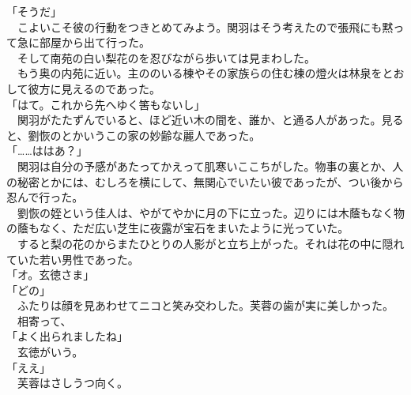 \documentclass[
  paper=a5,
  fontsize=10pt,
  jafontsize=9.5pt,
  tate,                  %
  open_bracket_pos=nibu, %
]{jlreq}
\begin{document}
「そうだ」\\


　こよいこそ彼の行動をつきとめてみよう。関羽はそう考えたので張飛にも黙って急に部屋から出て行った。\\


　そして南苑の白い梨花のを忍びながら歩いては見まわした。\\


　もう奥の内苑に近い。主ののいる棟やその家族らの住む棟の燈火は林泉をとおして彼方に見えるのであった。\\


「はて。これから先へゆく筈もないし」\\


　関羽がたたずんでいると、ほど近い木の間を、誰か、と通る人があった。見ると、劉恢のとかいうこの家の妙齢な麗人であった。\\


「……ははあ？」\\


　関羽は自分の予感があたってかえって肌寒いここちがした。物事の裏とか、人の秘密とかには、むしろを横にして、無関心でいたい彼であったが、つい後から忍んで行った。\\


　劉恢の姪という佳人は、やがてやかに月の下に立った。辺りには木蔭もなく物の蔭もなく、ただ広い芝生に夜露が宝石をまいたように光っていた。\\


　すると梨の花のからまたひとりの人影がと立ち上がった。それは花の中に隠れていた若い男性であった。\\


「オ。玄徳さま」\\


「どの」\\


　ふたりは顔を見あわせてニコと笑み交わした。芙蓉の歯が実に美しかった。\\


　相寄って、\\


「よく出られましたね」\\


　玄徳がいう。\\


「ええ」\\


　芙蓉はさしうつ向く。\\
\end{document}
